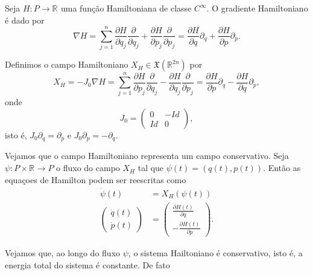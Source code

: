 \documentclass[12pt]{book}
\newcommand{\campohamiltoniano}[1]{X_{H}(#1)}
\newcommand{\campohamiltonianoabrev}{X_{H}}
\newcommand{\campossuaves}[1]{\mathfrak{X}(#1)}
\newcommand{\derivadaparcial}[2]{\frac{\partial #1}{\partial #2}}
\newcommand{\derivadaparcialabrev}[1]{\partial_{#1}}
\newcommand{\estruturacomplexa}{J_{0}}
\newcommand{\real}[1]{\mathbb{R}^{#1}}
\newcommand{\reta}{\real{}}
\begin{document}
	Seja $H:P \to \reta$ uma função Hamiltoniana de classe $C^{\infty}$. O gradiente Hamiltoniano é dado por
	$$
	\nabla H =\sum_{j=1}^{n}\derivadaparcial{H}{q_{j}}\derivadaparcial{}{q_{j}} + \derivadaparcial{H}{p_{j}}\derivadaparcial{}{p_{j}} = \derivadaparcial{H}{q}\derivadaparcialabrev{q} + \derivadaparcial{H}{p}\derivadaparcialabrev{p}.
	$$
	
	Definimos o campo Hamiltoniano $\campohamiltonianoabrev \in \campossuaves{\real{2n}}$ por 
	$$
	\campohamiltonianoabrev = -\estruturacomplexa \nabla H = \sum_{j=1}^{n}\derivadaparcial{H}{p_{j}}\derivadaparcial{}{q_{j}} - \derivadaparcial{H}{q_{j}}\derivadaparcial{}{p_{j}} = \derivadaparcial{H}{p}\derivadaparcialabrev{q} - \derivadaparcial{H}{q}\derivadaparcialabrev{p}, 
	$$
	onde
	$$
	\estruturacomplexa=
	\left(
	\begin{array}{cc}
	0 & -Id
	\\
	Id & 0
	\end{array}
	\right), 
	$$
	isto é, $\estruturacomplexa \derivadaparcialabrev{q} = \derivadaparcialabrev{p}$ e $\estruturacomplexa \derivadaparcialabrev{p} = -\derivadaparcialabrev{q}$.
	
	Vejamos que o campo Hamiltoniano representa um campo conservativo. Seja $\psi:P\times \reta \to P$ o fluxo do campo $\campohamiltonianoabrev$ tal que $\psi(t) = (q(t), p(t))$. Então as equaçoes de Hamilton podem ser reescritas como 
	$$
	\begin{aligned}
	\dot{\psi}(t) &= \campohamiltoniano{\psi(t)}
	\\
	\left(
	\begin{array}{c}
	\dot{q}(t)
	\\
	\dot{p}(t)
	\end{array}
	\right)
	&=
	\left(
	\begin{array}{c}
	\derivadaparcial{H(t)}{q}
	\\
	-\derivadaparcial{H(t)}{p}
	\end{array}
	\right).
	\end{aligned}
	$$	
	
	Vejamos que, ao longo do fluxo $\psi$, o sistema Hailtoniano é conservativo, isto é, a energia total do sistema é constante. De fato
	
\end{document}
